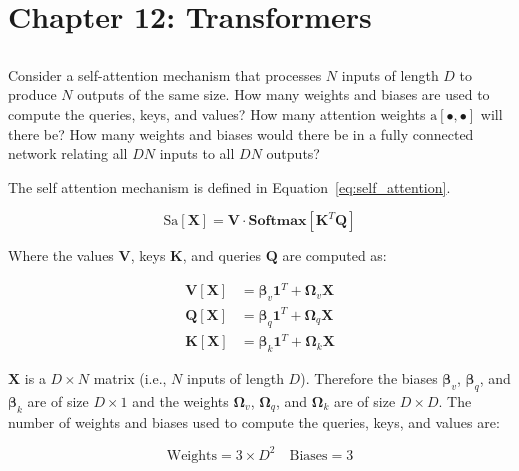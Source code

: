 \documentclass[12pt]{report}
\begin{document}
\section*{Chapter 12: Transformers}

\subsection{}
\begin{mdframed}
    Consider a self-attention mechanism that processes $N$ inputs of length $D$ to produce $N$ outputs of the same size. How many weights and biases are used to compute the queries, keys, and values? How many attention weights $\text{a}[\bullet, \bullet]$ will there be? How many weights and biases would there be in a fully connected network relating all $DN$ inputs to all $DN$ outputs?
\end{mdframed}

The self attention mechanism is defined in Equation~\eqref{eq:self_attention}.

\begin{equation}
    \text{Sa}[\mathbf{X}] = \mathbf{V} \cdot \mathbf{Softmax}[\mathbf{K}^{T}\mathbf{Q}]
    \label{eq:self_attention}
\end{equation}

Where the values $\mathbf{V}$, keys $\mathbf{K}$, and queries $\mathbf{Q}$ are computed as:

\begin{align}
    \mathbf{V}[\mathbf{X}] & = \boldsymbol{\beta}_{v}\mathbf{1}^{T} + \boldsymbol{\Omega}_{v}\mathbf{X} \\
    \mathbf{Q}[\mathbf{X}] & = \boldsymbol{\beta}_{q}\mathbf{1}^{T} + \boldsymbol{\Omega}_{q}\mathbf{X} \\
    \mathbf{K}[\mathbf{X}] & = \boldsymbol{\beta}_{k}\mathbf{1}^{T} + \boldsymbol{\Omega}_{k}\mathbf{X}
\end{align}

$\mathbf{X}$ is a $D \times N$ matrix (i.e., $N$ inputs of length $D$). Therefore the biases $\boldsymbol{\beta}_{v}$, $\boldsymbol{\beta}_{q}$, and $\boldsymbol{\beta}_{k}$ are of size $D \times 1$ and the weights $\boldsymbol{\Omega}_{v}$, $\boldsymbol{\Omega}_{q}$, and $\boldsymbol{\Omega}_{k}$ are of size $D \times D$. The number of weights and biases used to compute the queries, keys, and values are:

\begin{equation}
    \text{Weights} = 3 \times D^{2} \quad \text{Biases} = 3
\end{equation}
\end{document}
